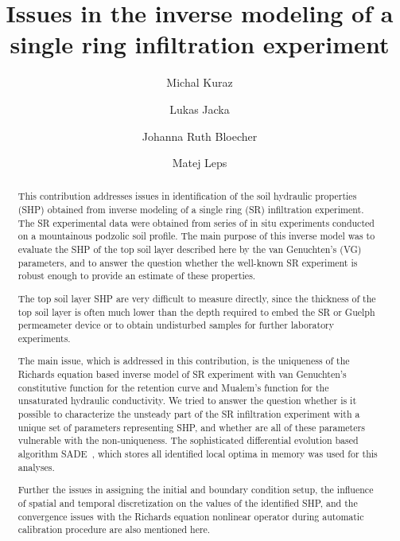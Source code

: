 \documentclass[review]{elsarticle}
\begin{document}
\begin{frontmatter}

\title{Issues in the inverse modeling of a single ring infiltration experiment}

\author[autor1]{Michal Kuraz}

\author[autor1]{Lukas Jacka}

\author[autor1]{Johanna Ruth Bloecher}

\author[autor2]{Matej Leps}



\address[autor1]{Czech University of Life Sciences Prague, Faculty of Environmental Sciences, Department of Water Resources and Environmental Modeling}

\address[autor2]{Czech Technical University in Prague, Faculty of Civil Engineering, Department of Mechanics}

\begin{abstract}
This contribution addresses issues in identification of the soil hydraulic properties (SHP) obtained from inverse modeling of a single ring (SR) infiltration experiment. 
The SR experimental  data  were obtained from series of in situ experiments conducted on a mountainous podzolic soil profile. 
The main purpose of this inverse model was to evaluate the SHP of the top soil layer described here by the van Genuchten's (VG) parameters, and to answer the question whether the well-known SR experiment is robust enough to provide an estimate of these properties.

The top soil layer  SHP are very difficult to measure directly, since the thickness of the top soil layer is often much lower than the depth required to embed the SR or Guelph permeameter device or to obtain  undisturbed samples for further laboratory experiments.


The main issue, which is addressed in this contribution, is the uniqueness of the Richards equation based inverse model of SR experiment with van Genuchten's constitutive function for the retention curve and Mualem's function for the unsaturated hydraulic conductivity. We tried to answer the question whether is it possible to characterize the unsteady part of the SR infiltration experiment with a unique set of parameters representing  SHP, and whether are all of these parameters vulnerable with the non-uniqueness. The sophisticated differential evolution based algorithm SADE~\cite{grade}, which stores all identified local optima in memory was used for this analyses.

Further the issues in assigning the initial and boundary condition setup, the influence of spatial and temporal discretization on the values of the identified SHP, and the convergence issues with the Richards equation nonlinear operator during automatic calibration procedure are also mentioned here.
\end{abstract}


\end{frontmatter}
\end{document}
